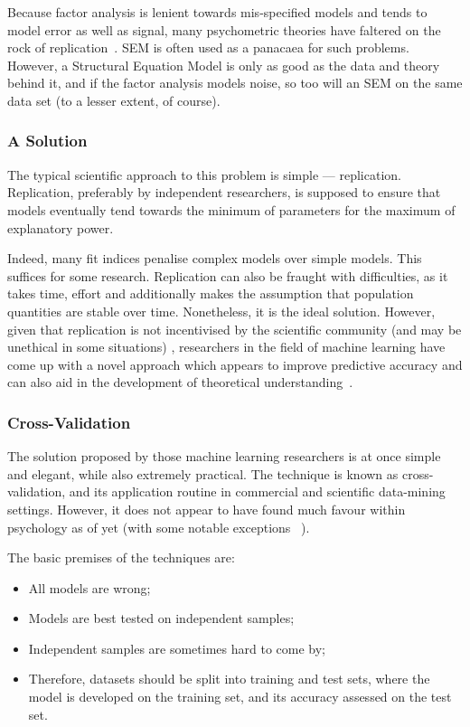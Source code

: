 Because factor analysis is lenient towards mis-specified models and tends to model error as well as signal, many psychometric theories have faltered on the rock of replication~\cite{fabrigar1999evaluating}. SEM is often used as a panacaea for such problems. However, a Structural Equation Model is only as good as the data and theory behind it, and if the factor analysis models noise, so too will an SEM on the same data set (to a lesser extent, of course). %

\subsubsection{A Solution}

The typical scientific approach to this problem is simple --- replication. Replication, preferably by independent researchers, is supposed to ensure that models eventually tend towards the minimum of parameters for the maximum of explanatory power.

Indeed, many fit indices penalise complex models over simple models. This suffices for some research. Replication can also be fraught with difficulties, as it takes time, effort and additionally makes the assumption that population quantities are stable over time. Nonetheless, it is the ideal solution. However, given that replication is not incentivised by the scientific community (and may be unethical in some situations) \cite{roediger2013psychology}, researchers in the field of machine learning have come up with a novel approach which appears to improve predictive accuracy and can also aid in the development of theoretical understanding~\cite{friedman2009elements}.

\subsubsection{Cross-Validation}

The solution proposed by those machine learning researchers is at once simple and elegant, while also extremely practical. The technique is known as cross-validation, and its application routine in commercial and scientific data-mining settings. However, it does not appear to have found much favour within psychology as of yet (with some notable exceptions ~\cite{dawes1979robust}).

The basic premises of the techniques are:
\begin{itemize}
\item All models are wrong;
\item Models are best tested on independent samples;
\item Independent samples are sometimes hard to come by;
\item Therefore, datasets should be split into training and test sets, where the model is developed on the training set, and its accuracy assessed on the test set.
\end{itemize}

